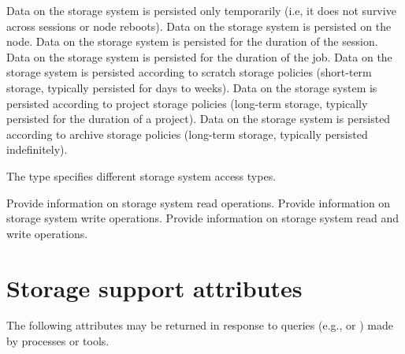 \begin{constantdesc}
%
Data on the storage system is persisted only temporarily (i.e, it does not survive across sessions or node reboots).
%
Data on the storage system is persisted on the node.
%
Data on the storage system is persisted for the duration of the session.
%
Data on the storage system is persisted for the duration of the job.
%
Data on the storage system is persisted according to scratch storage policies (short-term storage, typically persisted for days to weeks).
%
Data on the storage system is persisted according to project storage policies (long-term storage, typically persisted for the duration of a project).
%
Data on the storage system is persisted according to archive storage policies (long-term storage, typically persisted indefinitely).
%
\end{constantdesc}

\provisionalMarker{}

The  type specifies different storage system access types.

\begin{constantdesc}
%
Provide information on storage system read operations.
%
Provide information on storage system write operations.
%
Provide information on storage system read and write operations.
%
\end{constantdesc}


\section{Storage support attributes}
\label{api:struct:attributes:pstrg}

The following attributes may be returned in response to queries (e.g.,  or ) made by processes or tools.

%

